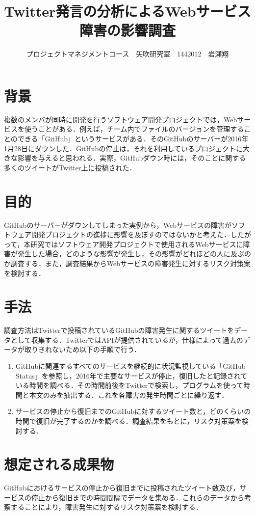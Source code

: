 \documentclass[uplatex,twocolumn,dvipdfmx]{jsarticle}
\title{\vspace{-5mm}\fontsize{14pt}{0pt}\selectfont Twitter発言の分析によるWebサービス障害の影響調査}
\author{\normalsize プロジェクトマネジメントコース　矢吹研究室　1442012　岩瀬翔}
\date{}
\begin{document}
\fontsize{10.5pt}{\baselineskip}\selectfont
\maketitle





\section{背景}
複数のメンバが同時に開発を行うソフトウェア開発プロジェクトでは，Webサービスを使うことがある．例えば，チーム内でファイルのバージョンを管理することのできる「GitHub」というサービスがある\cite{01}．そのGitHubのサーバーが2016年1月28日にダウンした．GitHubの停止は，それを利用しているプロジェクトに大きな影響を与えると思われる．実際，GitHubダウン時には，そのことに関する多くのツイートがTwitter上に投稿された\cite{02}．
\section{目的}
GitHubのサーバーがダウンしてしまった実例から，Webサービスの障害がソフトウェア開発プロジェクトの進捗に影響を及ぼすのではないかと考えた．したがって，本研究ではソフトウェア開発プロジェクトで使用されるWebサービスに障害が発生した場合，どのような影響が発生し，その影響がどれほどの人に及ぶのか調査する．また，調査結果からWebサービスの障害発生に対するリスク対策案を検討する．
\section{手法}
調査方法はTwitterで投稿されているGitHubの障害発生に関するツイートをデータとして収集する．TwitterではAPIが提供されているが，仕様によって過去のデータが取りきれないため以下の手順で行う．
\begin{enumerate}
 \item GitHubに関連するすべてのサービスを継続的に状況監視している「GitHub Status」を参照し，2016年で主要なサービスが停止，復旧したと記録されている時間を調べる．その時間前後をTwitterで検索し，プログラムを使って時間と本文のみを抽出する．これを各障害の発生時間ごとに繰り返す\cite{03}．
 \item サービスの停止から復旧までのGitHubに対するツイート数と，どのくらいの時間で復旧が完了するのかを調べる．調査結果をもとに，リスク対策案を検討する．
\end{enumerate}
\section{想定される成果物}
GitHubにおけるサービスの停止から復旧までに投稿されたツイート数及び，サービスの停止から復旧までの時間間隔でデータを集める．これらのデータから考察することにより，障害発生に対するリスク対策案を検討する．
\end{document}
